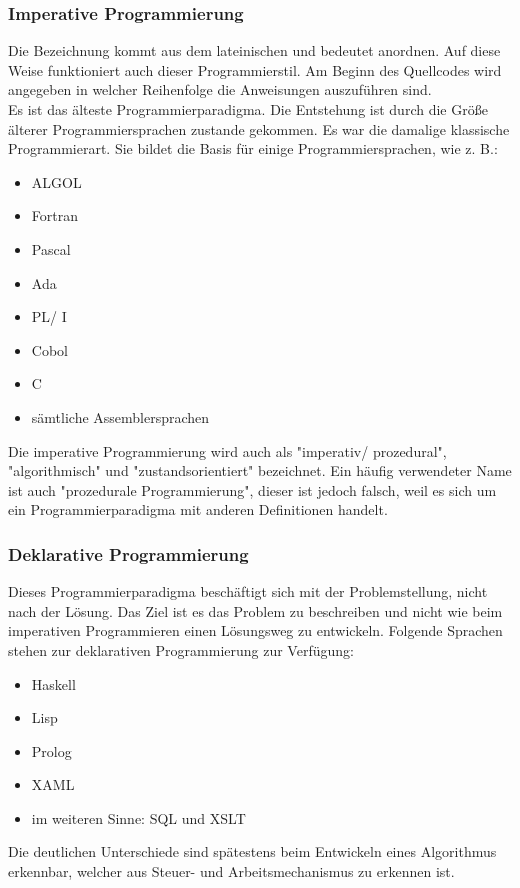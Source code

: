 \documentclass[12pt,a4paper]{report}
\begin{document}
\begin{onehalfspace}
\subsubsection{Imperative Programmierung}
Die Bezeichnung kommt aus dem lateinischen und bedeutet anordnen. Auf diese Weise funktioniert auch dieser Programmierstil. Am Beginn des Quellcodes wird angegeben in welcher Reihenfolge die Anweisungen auszuführen sind.\\

Es ist das älteste Programmierparadigma. Die Entstehung ist durch die Größe älterer Programmiersprachen zustande gekommen. Es war die damalige klassische Programmierart. Sie bildet die Basis für einige Programmiersprachen, wie z. B.:
\begin{itemize}
\item ALGOL
\item Fortran
\item Pascal
\item Ada
\item PL/ I
\item Cobol
\item C
\item sämtliche Assemblersprachen
\end{itemize}
Die imperative Programmierung wird auch als "{}imperativ/ prozedural"{}, "{}algorithmisch"{} und "{}zustandsorientiert"{} bezeichnet. Ein häufig verwendeter Name ist auch "{}prozedurale Programmierung"{}, dieser ist jedoch falsch, weil es sich um ein Programmierparadigma mit anderen Definitionen handelt.

\subsubsection{Deklarative Programmierung}
Dieses Programmierparadigma beschäftigt sich mit der Problemstellung, nicht nach der Lösung. Das Ziel ist es das Problem zu beschreiben und nicht wie beim imperativen Programmieren einen Lösungsweg zu entwickeln.
Folgende Sprachen stehen zur deklarativen Programmierung zur Verfügung:
\begin{itemize}
\item Haskell
\item Lisp
\item Prolog
\item XAML
\item im weiteren Sinne: SQL und XSLT
\end{itemize} 
Die deutlichen Unterschiede sind spätestens beim Entwickeln eines Algorithmus erkennbar, welcher aus Steuer- und Arbeitsmechanismus zu erkennen ist.\\


\end{onehalfspace}
\end{document}
